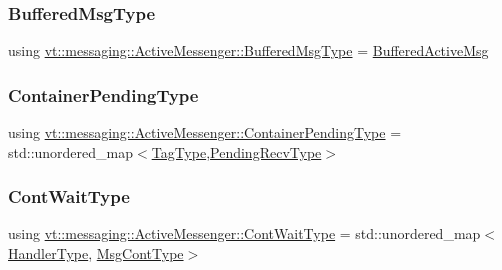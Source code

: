 \subsubsection{\texorpdfstring{Buffered\+Msg\+Type}{BufferedMsgType}}
{\footnotesize\ttfamily using \hyperlink{structvt_1_1messaging_1_1_active_messenger_a80a9cbda399d7bf035bfcecc761f4b02}{vt\+::messaging\+::\+Active\+Messenger\+::\+Buffered\+Msg\+Type} =  \hyperlink{structvt_1_1messaging_1_1_buffered_active_msg}{Buffered\+Active\+Msg}}

\mbox{\label{structvt_1_1messaging_1_1_active_messenger_a388e97eeb72592e57551e045b43bcfde}} 
\subsubsection{\texorpdfstring{Container\+Pending\+Type}{ContainerPendingType}}
{\footnotesize\ttfamily using \hyperlink{structvt_1_1messaging_1_1_active_messenger_a388e97eeb72592e57551e045b43bcfde}{vt\+::messaging\+::\+Active\+Messenger\+::\+Container\+Pending\+Type} =  std\+::unordered\+\_\+map$<$\hyperlink{namespacevt_a84ab281dae04a52a4b243d6bf62d0e52}{Tag\+Type},\hyperlink{structvt_1_1messaging_1_1_active_messenger_add1d7ab7bf168d53dfe7b93f29f64f02}{Pending\+Recv\+Type}$>$}

\mbox{\label{structvt_1_1messaging_1_1_active_messenger_a1c52f4ec0c93821191cb3e69dc7c8604}} 
\subsubsection{\texorpdfstring{Cont\+Wait\+Type}{ContWaitType}}
{\footnotesize\ttfamily using \hyperlink{structvt_1_1messaging_1_1_active_messenger_a1c52f4ec0c93821191cb3e69dc7c8604}{vt\+::messaging\+::\+Active\+Messenger\+::\+Cont\+Wait\+Type} =  std\+::unordered\+\_\+map$<$\hyperlink{namespacevt_af64846b57dfcaf104da3ef6967917573}{Handler\+Type}, \hyperlink{structvt_1_1messaging_1_1_active_messenger_a18bbfbf9ecd82b33f6fc475b2e5290a5}{Msg\+Cont\+Type}$>$}


